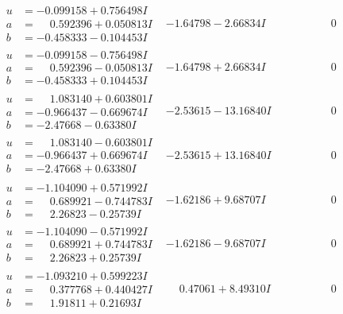 \documentclass[1p]{elsarticle_modified}
\theoremstyle{definition}
\begin{document}
$$\begin{array}{c|c|c}
\begin{aligned}
u &= -0.099158 + 0.756498 I \\
a &= \phantom{-}0.592396 + 0.050813 I \\
b &= -0.458333 - 0.104453 I\end{aligned}
 & -1.64798 - 2.66834 I & \phantom{-0.000000 } 0 \\ \hline\begin{aligned}
u &= -0.099158 - 0.756498 I \\
a &= \phantom{-}0.592396 - 0.050813 I \\
b &= -0.458333 + 0.104453 I\end{aligned}
 & -1.64798 + 2.66834 I & \phantom{-0.000000 } 0 \\ \hline\begin{aligned}
u &= \phantom{-}1.083140 + 0.603801 I \\
a &= -0.966437 - 0.669674 I \\
b &= -2.47668 - 0.63380 I\end{aligned}
 & -2.53615 - 13.16840 I & \phantom{-0.000000 } 0 \\ \hline\begin{aligned}
u &= \phantom{-}1.083140 - 0.603801 I \\
a &= -0.966437 + 0.669674 I \\
b &= -2.47668 + 0.63380 I\end{aligned}
 & -2.53615 + 13.16840 I & \phantom{-0.000000 } 0 \\ \hline\begin{aligned}
u &= -1.104090 + 0.571992 I \\
a &= \phantom{-}0.689921 - 0.744783 I \\
b &= \phantom{-}2.26823 - 0.25739 I\end{aligned}
 & -1.62186 + 9.68707 I & \phantom{-0.000000 } 0 \\ \hline\begin{aligned}
u &= -1.104090 - 0.571992 I \\
a &= \phantom{-}0.689921 + 0.744783 I \\
b &= \phantom{-}2.26823 + 0.25739 I\end{aligned}
 & -1.62186 - 9.68707 I & \phantom{-0.000000 } 0 \\ \hline\begin{aligned}
u &= -1.093210 + 0.599223 I \\
a &= \phantom{-}0.377768 + 0.440427 I \\
b &= \phantom{-}1.91811 + 0.21693 I\end{aligned}
 & \phantom{-}0.47061 + 8.49310 I & \phantom{-0.000000 } 0 \\ \hline\begin{aligned}

\end{aligned}
\end{array}$$
\end{document}
